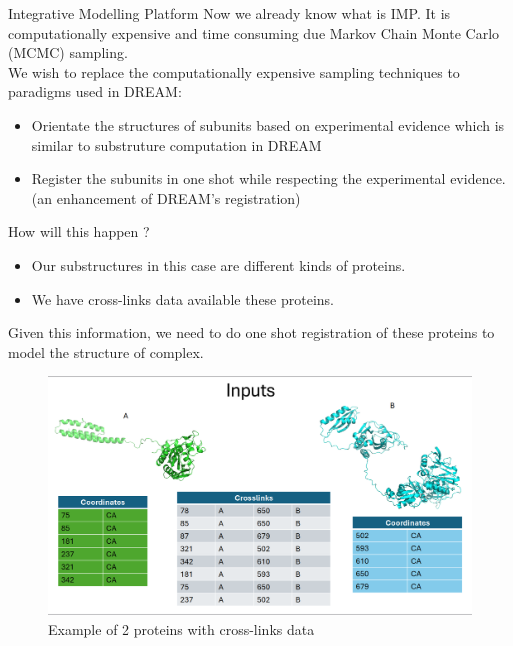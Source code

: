 \begin{frame}{Integrative Modelling Platform}
    Now we already know what is IMP. It is computationally expensive and time consuming due Markov Chain Monte Carlo (MCMC) sampling. \\
    \bigskip
    \pause
    We wish to replace the computationally expensive sampling techniques to paradigms used in DREAM: \\
    \begin{itemize}
        \item Orientate the structures of subunits based on experimental evidence which is similar to substruture computation in DREAM
        \item Register the subunits in one shot while respecting the experimental evidence. (an enhancement of DREAM's registration)
    \end{itemize}
\end{frame}

\begin{frame}{How will this happen ?}
    \begin{itemize}
        \item Our substructures in this case are different kinds of proteins. \\
        \item We have cross-links data available these proteins. \\
    \end{itemize}

    Given this information, we need to do one shot registration of these proteins to model the structure of complex.

\end{frame}

\begin{frame}{}
    \begin{figure}
        \centering
        \includegraphics[width=1\textwidth]{images/local.png}
        \caption{Example of 2 proteins with cross-links data}
        \label{fig:my_label}
    \end{figure}
\end{frame}

